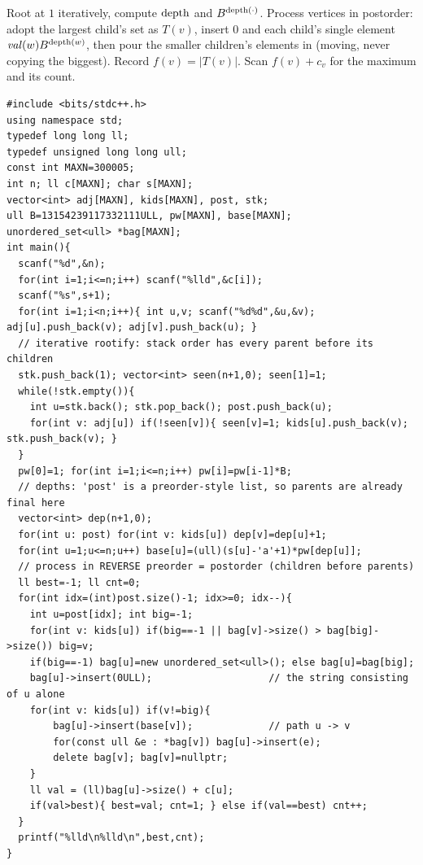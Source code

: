 Root at \(1\) iteratively, compute \(\operatorname{depth}\) and \(B^{\operatorname{depth}(\cdot)}\).  Process
vertices in postorder: adopt the largest child's set as \(T(v)\), insert \(0\) and
each child's single element \(\mathit{val}(w)B^{\operatorname{depth}(w)}\), then pour the smaller
children's elements in (moving, never copying the biggest).  Record
\(f(v)=|T(v)|\).  Scan \(f(v)+c_v\) for the maximum and its count.

\begin{lstlisting}[caption={CF 601D. Depth-weighted string hashes + small-to-large set merge. Iterative postorder (n=3e5). ASCII only, identifiers without underscores}, label={lst:c22-organic}]
#include <bits/stdc++.h>
using namespace std;
typedef long long ll;
typedef unsigned long long ull;
const int MAXN=300005;
int n; ll c[MAXN]; char s[MAXN];
vector<int> adj[MAXN], kids[MAXN], post, stk;
ull B=13154239117332111ULL, pw[MAXN], base[MAXN];
unordered_set<ull> *bag[MAXN];
int main(){
  scanf("%d",&n);
  for(int i=1;i<=n;i++) scanf("%lld",&c[i]);
  scanf("%s",s+1);
  for(int i=1;i<n;i++){ int u,v; scanf("%d%d",&u,&v); adj[u].push_back(v); adj[v].push_back(u); }
  // iterative rootify: stack order has every parent before its children
  stk.push_back(1); vector<int> seen(n+1,0); seen[1]=1;
  while(!stk.empty()){
    int u=stk.back(); stk.pop_back(); post.push_back(u);
    for(int v: adj[u]) if(!seen[v]){ seen[v]=1; kids[u].push_back(v); stk.push_back(v); }
  }
  pw[0]=1; for(int i=1;i<=n;i++) pw[i]=pw[i-1]*B;
  // depths: 'post' is a preorder-style list, so parents are already final here
  vector<int> dep(n+1,0);
  for(int u: post) for(int v: kids[u]) dep[v]=dep[u]+1;
  for(int u=1;u<=n;u++) base[u]=(ull)(s[u]-'a'+1)*pw[dep[u]];
  // process in REVERSE preorder = postorder (children before parents)
  ll best=-1; ll cnt=0;
  for(int idx=(int)post.size()-1; idx>=0; idx--){
    int u=post[idx]; int big=-1;
    for(int v: kids[u]) if(big==-1 || bag[v]->size() > bag[big]->size()) big=v;
    if(big==-1) bag[u]=new unordered_set<ull>(); else bag[u]=bag[big];
    bag[u]->insert(0ULL);                    // the string consisting of u alone
    for(int v: kids[u]) if(v!=big){
        bag[u]->insert(base[v]);             // path u -> v
        for(const ull &e : *bag[v]) bag[u]->insert(e);
        delete bag[v]; bag[v]=nullptr;
    }
    ll val = (ll)bag[u]->size() + c[u];
    if(val>best){ best=val; cnt=1; } else if(val==best) cnt++;
  }
  printf("%lld\n%lld\n",best,cnt);
}
\end{lstlisting}

